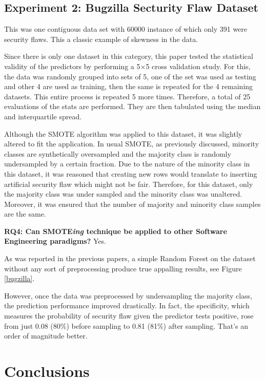 \documentclass[12pt]{IEEEtran}
\begin{document}
\subsection{Experiment 2: Bugzilla Secturity Flaw Dataset}

This was one contiguous data set with 60000 instance of which only 391 were security flaws. This a classic example of skewness in the data.

Since there is only one dataset in this category, this paper tested the statistical validity of the predictors by performing a 5$\times$5 cross validation study. For this, the data was randomly grouped into sets of 5, one of the set was used as testing and other 4 are used as training, then the same is repeated for the 4 remaining datasets. This entire process is repeated 5 more times. Therefore, a total of 25 evaluations of the stats are performed. They are then tabulated using the median and interquartile spread.

Although the SMOTE algorithm was applied to this dataset, it was slightly altered to fit the application. In usual SMOTE, as previously discussed, minority classes are synthetically oversampled and the majority class is randomly undersampled by a certain fraction. Due to the nature of the minority class in this dataset, it was reasoned that creating new rows would translate to inserting artificial security flaw which might not be fair. Therefore, for this dataset, only the majority class was under sampled and the minority class was unaltered. Moreover, it was ensured that the number of majority and minority class samples are the same.

{{\bfseries RQ4: Can SMOTE\textit{ing} technique be applied to other Software Engineering paradigms?} Yes.}


As was reported in the previous papers, a simple Random Forest on the dataset without any sort of preprocessing produce true appalling results, see Figure \ref{bugzilla}.

However, once the data was preprocessed by undersampling the majority class, the prediction performance improved drastically. In fact, the specificity, which measures the probability of security flaw given the predictor tests positive, rose from just 0.08 (80\%) before sampling to 0.81 (81\%) after sampling. That's an order of magnitude better. 
 
\section{Conclusions}
\end{document}
